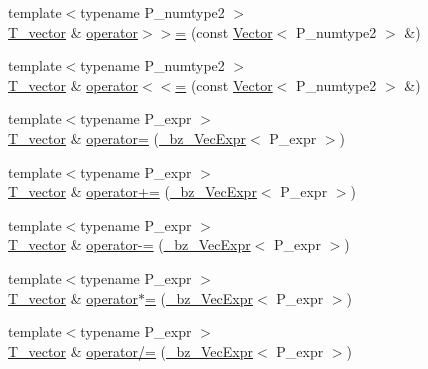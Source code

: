 \begin{DoxyCompactItemize}
{\footnotesize template$<$typename P\+\_\+numtype2 $>$ }\\\hyperlink{classTinyVector_aea08e4463006acf6842a93c026b27094}{T\+\_\+vector} \& \hyperlink{classTinyVector_a1f4bc7c6cfbdc6cbeabe80592f4703b4}{operator$>$$>$=} (const \hyperlink{classVector}{Vector}$<$ P\+\_\+numtype2 $>$ \&)
\item 
{\footnotesize template$<$typename P\+\_\+numtype2 $>$ }\\\hyperlink{classTinyVector_aea08e4463006acf6842a93c026b27094}{T\+\_\+vector} \& \hyperlink{classTinyVector_a88a446c80a5c642eac50c88f968f0daf}{operator$<$$<$=} (const \hyperlink{classVector}{Vector}$<$ P\+\_\+numtype2 $>$ \&)
\item 
{\footnotesize template$<$typename P\+\_\+expr $>$ }\\\hyperlink{classTinyVector_aea08e4463006acf6842a93c026b27094}{T\+\_\+vector} \& \hyperlink{classTinyVector_a6f926be1522f058e4259195f70f3b542}{operator=} (\hyperlink{class__bz__VecExpr}{\+\_\+bz\+\_\+\+Vec\+Expr}$<$ P\+\_\+expr $>$)
\item 
{\footnotesize template$<$typename P\+\_\+expr $>$ }\\\hyperlink{classTinyVector_aea08e4463006acf6842a93c026b27094}{T\+\_\+vector} \& \hyperlink{classTinyVector_aac5c989b144b669e8b2579db3628e622}{operator+=} (\hyperlink{class__bz__VecExpr}{\+\_\+bz\+\_\+\+Vec\+Expr}$<$ P\+\_\+expr $>$)
\item 
{\footnotesize template$<$typename P\+\_\+expr $>$ }\\\hyperlink{classTinyVector_aea08e4463006acf6842a93c026b27094}{T\+\_\+vector} \& \hyperlink{classTinyVector_a3fa938c8bd7e8c786578982d8eb2f870}{operator-\/=} (\hyperlink{class__bz__VecExpr}{\+\_\+bz\+\_\+\+Vec\+Expr}$<$ P\+\_\+expr $>$)
\item 
{\footnotesize template$<$typename P\+\_\+expr $>$ }\\\hyperlink{classTinyVector_aea08e4463006acf6842a93c026b27094}{T\+\_\+vector} \& \hyperlink{classTinyVector_aa1567f7193ede568fa55664012b0732e}{operator$\ast$=} (\hyperlink{class__bz__VecExpr}{\+\_\+bz\+\_\+\+Vec\+Expr}$<$ P\+\_\+expr $>$)
\item 
{\footnotesize template$<$typename P\+\_\+expr $>$ }\\\hyperlink{classTinyVector_aea08e4463006acf6842a93c026b27094}{T\+\_\+vector} \& \hyperlink{classTinyVector_a09eb5f9d1522d3150a825b32a98b1750}{operator/=} (\hyperlink{class__bz__VecExpr}{\+\_\+bz\+\_\+\+Vec\+Expr}$<$ P\+\_\+expr $>$)
\item 

\end{DoxyCompactItemize}
